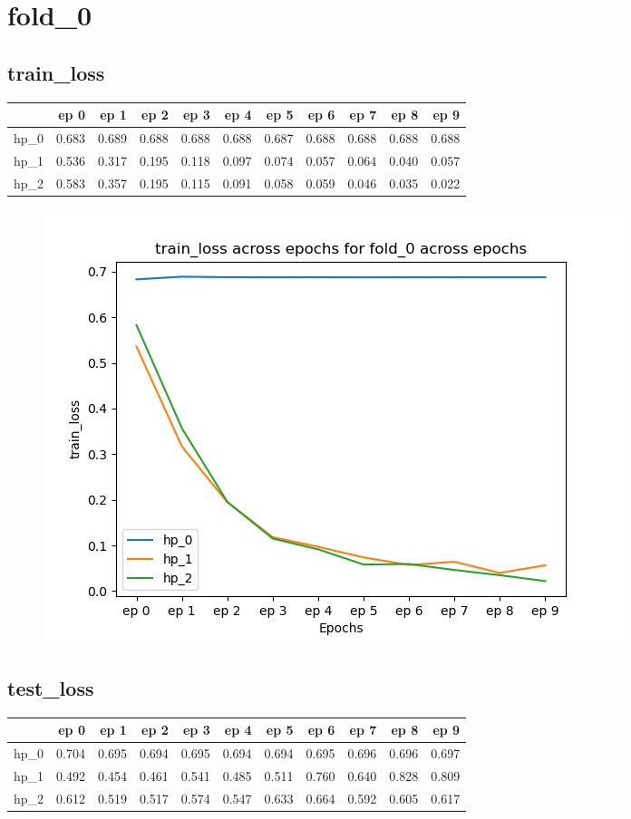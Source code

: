 \documentclass{article}
\begin{document}
\section{fold\_0}
\subsection{train\_loss}
\begin{tabular}{lrrrrrrrrrr}
\toprule
{} &   ep 0 &   ep 1 &   ep 2 &   ep 3 &   ep 4 &   ep 5 &   ep 6 &   ep 7 &   ep 8 &   ep 9 \\
\midrule
hp\_0 &  0.683 &  0.689 &  0.688 &  0.688 &  0.688 &  0.687 &  0.688 &  0.688 &  0.688 &  0.688 \\
hp\_1 &  0.536 &  0.317 &  0.195 &  0.118 &  0.097 &  0.074 &  0.057 &  0.064 &  0.040 &  0.057 \\
hp\_2 &  0.583 &  0.357 &  0.195 &  0.115 &  0.091 &  0.058 &  0.059 &  0.046 &  0.035 &  0.022 \\
\bottomrule
\end{tabular}

\begin{figure}[H]
\includegraphics[scale = 0.75]{fold_0/train_loss}
\end{figure}
\subsection{test\_loss}
\begin{tabular}{lrrrrrrrrrr}
\toprule
{} &   ep 0 &   ep 1 &   ep 2 &   ep 3 &   ep 4 &   ep 5 &   ep 6 &   ep 7 &   ep 8 &   ep 9 \\
\midrule
hp\_0 &  0.704 &  0.695 &  0.694 &  0.695 &  0.694 &  0.694 &  0.695 &  0.696 &  0.696 &  0.697 \\
hp\_1 &  0.492 &  0.454 &  0.461 &  0.541 &  0.485 &  0.511 &  0.760 &  0.640 &  0.828 &  0.809 \\
hp\_2 &  0.612 &  0.519 &  0.517 &  0.574 &  0.547 &  0.633 &  0.664 &  0.592 &  0.605 &  0.617 \\
\bottomrule
\end{tabular}
\end{document}
